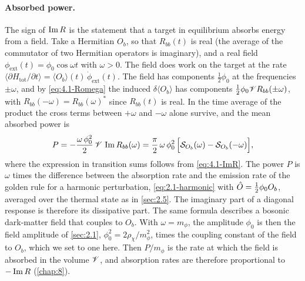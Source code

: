 \paragraph{Absorbed power.} The sign of $\operatorname{Im} R$ is the statement that a target in equilibrium absorbs energy from a field. Take a Hermitian $O_b$, so that $R_{bb}(t)$ is real (the average of the commutator of two Hermitian operators is imaginary), and a real field $\phi_{\mathrm{ext}}(t) = \phi_0\cos\omega t$ with $\omega > 0$. The field does work on the target at the rate $\langle\partial H_{\mathrm{tot}}/\partial t\rangle = \langle O_b\rangle(t)\,\dot\phi_{\mathrm{ext}}(t)$. The field has components $\tfrac12\phi_0$ at the frequencies $\pm\omega$, and by \cref{eq:4.1-Romega} the induced $\delta\langle O_b\rangle$ has components $\tfrac12\phi_0\mathscr{V} R_{bb}(\pm\omega)$, with $R_{bb}(-\omega) = R_{bb}(\omega)^*$ since $R_{bb}(t)$ is real. In the time average of the product the cross terms between $+\omega$ and $-\omega$ alone survive, and the mean absorbed power is
\begin{equation}
  P = -\frac{\omega\,\phi_0^2}{2}\,\mathscr{V}\,\operatorname{Im} R_{bb}(\omega) = \frac{\pi}{2}\,\omega\,\phi_0^2\,\Bigl[\mathcal{S}_{O_b}(\omega) - \mathcal{S}_{O_b}(-\omega)\Bigr] ,
  \label{eq:4.1-power}
\end{equation}
where the expression in transition sums follows from \cref{eq:4.1-ImR}. The power $P$ is $\omega$ times the difference between the absorption rate and the emission rate of the golden rule for a harmonic perturbation, \cref{eq:2.1-harmonic} with $\hat{O} = \tfrac12\phi_0O_b$, averaged over the thermal state as in \cref{sec:2.5}. The imaginary part of a diagonal response is therefore its dissipative part. The same formula describes a bosonic dark-matter field that couples to $O_b$. With $\omega = m_\phi$, the amplitude $\phi_0$ is then the field amplitude of \cref{sec:2.1}, $\phi_0^2 = 2\rho_\chi/m_\phi^2$, times the coupling constant of the field to $O_b$, which we set to one here. Then $P/m_\phi$ is the rate at which the field is absorbed in the volume $\mathscr{V}$, and absorption rates are therefore proportional to $-\operatorname{Im} R$ (\cref{chap:8}).

